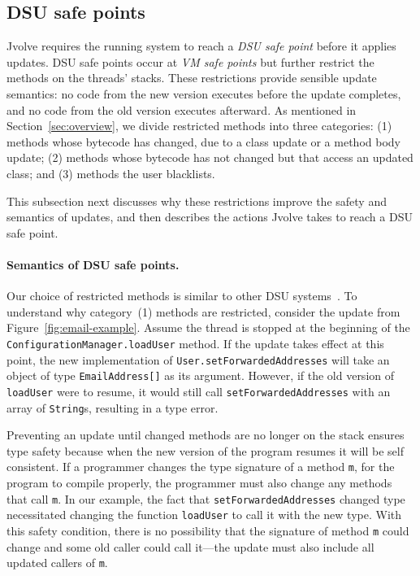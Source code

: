 \documentclass[9pt]{sigplanconf}
\newcommand{\DSU}{{\sc Jvolve}}
\begin{document}
\subsection{DSU safe points}
\label{sec:safe}

\DSU{} requires the running system to reach a \emph{DSU safe point}
before it applies updates.  DSU safe points occur at \emph{VM safe
  points} but further restrict the methods on the threads' stacks.
These restrictions provide sensible update semantics: no
code from the new version executes before the update completes, and no
code from the old version executes afterward.  As mentioned in
Section~\ref{sec:overview}, we divide restricted methods into three
categories: (1) methods whose bytecode has changed, due to a class
update or a method body update; (2) methods whose bytecode has not
changed but that access an updated class; and (3) methods the user
blacklists.

This subsection next discusses why these restrictions improve the safety
and semantics of updates, and then describes the actions \DSU{}
takes to reach a DSU safe point.


\paragraph{Semantics of DSU safe points.}

Our choice of restricted methods is similar to other DSU
systems~\cite{ritzau00dynamic,Mala00a,altekar05opus,eaddy05enc,JVMhotswap,VSEnC,chen:icse07,K42reconfig}.
To understand why category~(1) methods are restricted,
consider the update from Figure~\ref{fig:email-example}.  Assume the
thread is stopped at the beginning of the
{\tt ConfigurationManager.loadUser} method. If the update takes
effect at this point, the new implementation of
{\tt User.setForward\-ed\-Ad\-dresses} will take an object of type
{\tt EmailAddress[]} as its argument.  However, if the old version
of {\tt loadUser} were to resume, it would still call
{\tt set\-Forwarded\-Addresses} with an array of {\tt String}s,
resulting in a type error.

Preventing an update until changed methods are no longer
on the stack  
ensures type safety because when the new version of the program resumes it
will be self consistent.  If a 
programmer changes the type signature of a method {\tt m}, for the program to
compile properly, the programmer must also change any methods that
call {\tt m}.  
In our example, the fact that {\tt setForwardedAddresses}
changed type necessitated changing the function {\tt loadUser} to
call it with the new type.  With this safety condition, there is no
possibility that the signature of method
{\tt m} could change and some old caller could call it---the update must also
include all updated callers of {\tt m}.
\end{document}
